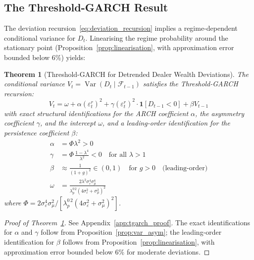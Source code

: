 \documentclass[12pt,a4paper]{article}
\newtheorem{theorem}{Theorem}[section]
\theoremstyle{definition}
\begin{document}
\subsection{The Threshold-GARCH Result}
\label{sec:tgarch_result}

The deviation recursion~\eqref{eq:deviation_recursion} implies a
regime-dependent conditional variance for $D_t$. Linearising the regime
probability around the stationary point
(Proposition~\ref{prop:linearisation}, with approximation error bounded
below 6\%) yields:

\begin{theorem}[Threshold-GARCH for Detrended Dealer Wealth Deviations]
\label{thm:tgarch}
The conditional variance $V_t = \operatorname{Var}(D_t \mid
\mathcal{F}_{t-1})$ satisfies the Threshold-GARCH recursion:
\begin{equation}
  V_t = \omega + \alpha(\varepsilon^r_t)^2
      + \gamma(\varepsilon^r_t)^2 \cdot \mathbf{1}[D_{t-1} < 0]
      + \beta V_{t-1}
  \label{eq:tgarch}
\end{equation}
with exact structural identifications for the ARCH coefficient $\alpha$,
the asymmetry coefficient $\gamma$, and the intercept $\omega$, and a
leading-order identification for the persistence coefficient $\beta$:
\begin{align}
  \alpha &= \Phi\lambda^2 > 0
    \label{eq:alpha} \\
  \gamma &= \Phi\,\frac{1-\lambda^4}{\lambda^2} < 0
    \quad \text{for all } \lambda > 1
    \label{eq:gamma} \\
  \beta  &\approx \frac{1}{(1+g)^2} \in (0,1)
    \quad \text{for } g > 0 \quad \text{(leading-order)}
    \label{eq:beta} \\
  \omega &= \frac{2\lambda^2\sigma^4_\varepsilon\sigma^4_\mu}
             {\lambda^{0\,2}_p(4\sigma^2_\varepsilon+\sigma^2_\mu)^2}
    \label{eq:omega}
\end{align}
where $\Phi = 2\sigma^4_\varepsilon\sigma^2_\mu /
[\lambda^{0\,2}_p(4\sigma^2_\varepsilon + \sigma^2_\mu)^2]$.
\end{theorem}

\begin{proof}[Proof of Theorem~\ref{thm:tgarch}]
See Appendix~\ref{app:tgarch_proof}. The exact identifications for
$\alpha$ and $\gamma$ follow from Proposition~\ref{prop:var_asym}; the
leading-order identification for $\beta$ follows from
Proposition~\ref{prop:linearisation}, with approximation error bounded
below 6\% for moderate deviations.
\end{proof}
\end{document}
